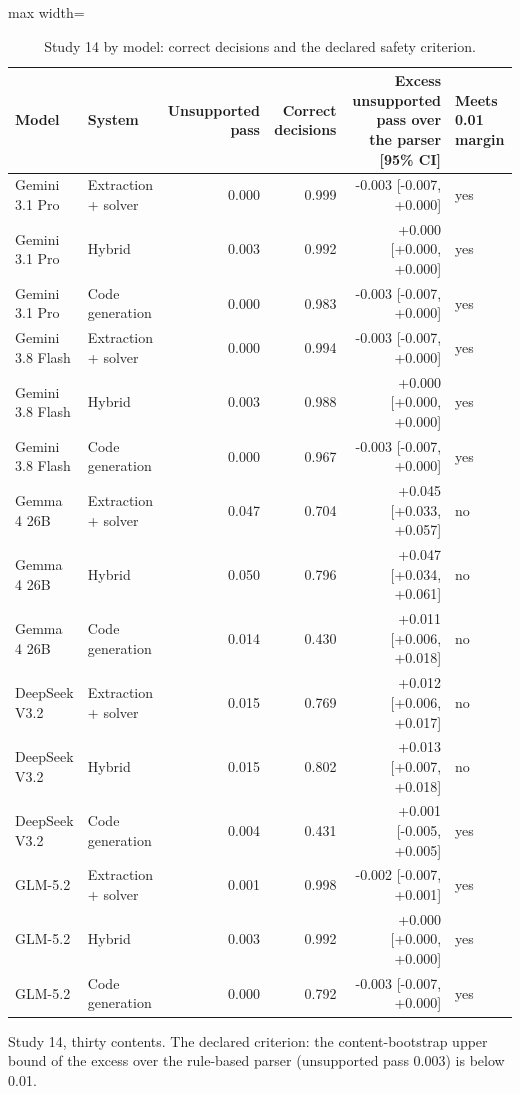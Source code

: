 \documentclass[10pt,twocolumn]{article}
\begin{document}
\begin{table}[t]
\centering\footnotesize\setlength{\tabcolsep}{4pt}
\caption{Study 14 by model: correct decisions and the declared safety criterion.}
\label{tab:29}
\begin{adjustbox}{max width=\textwidth}
\begin{tabular}{llrrrl}
\toprule
\textbf{Model} & \textbf{System} & \textbf{Unsupported pass} & \textbf{Correct decisions} & \textbf{Excess unsupported pass over the parser [95\% CI]} & \textbf{Meets 0.01 margin} \\
\midrule
Gemini 3.1 Pro & Extraction + solver & 0.000 & 0.999 & -0.003 [-0.007, +0.000] & yes \\
Gemini 3.1 Pro & Hybrid & 0.003 & 0.992 & +0.000 [+0.000, +0.000] & yes \\
Gemini 3.1 Pro & Code generation & 0.000 & 0.983 & -0.003 [-0.007, +0.000] & yes \\
Gemini 3.8 Flash & Extraction + solver & 0.000 & 0.994 & -0.003 [-0.007, +0.000] & yes \\
Gemini 3.8 Flash & Hybrid & 0.003 & 0.988 & +0.000 [+0.000, +0.000] & yes \\
Gemini 3.8 Flash & Code generation & 0.000 & 0.967 & -0.003 [-0.007, +0.000] & yes \\
Gemma 4 26B & Extraction + solver & 0.047 & 0.704 & +0.045 [+0.033, +0.057] & no \\
Gemma 4 26B & Hybrid & 0.050 & 0.796 & +0.047 [+0.034, +0.061] & no \\
Gemma 4 26B & Code generation & 0.014 & 0.430 & +0.011 [+0.006, +0.018] & no \\
DeepSeek V3.2 & Extraction + solver & 0.015 & 0.769 & +0.012 [+0.006, +0.017] & no \\
DeepSeek V3.2 & Hybrid & 0.015 & 0.802 & +0.013 [+0.007, +0.018] & no \\
DeepSeek V3.2 & Code generation & 0.004 & 0.431 & +0.001 [-0.005, +0.005] & yes \\
GLM-5.2 & Extraction + solver & 0.001 & 0.998 & -0.002 [-0.007, +0.001] & yes \\
GLM-5.2 & Hybrid & 0.003 & 0.992 & +0.000 [+0.000, +0.000] & yes \\
GLM-5.2 & Code generation & 0.000 & 0.792 & -0.003 [-0.007, +0.000] & yes \\
\bottomrule
\end{tabular}
\end{adjustbox}
\par\vspace{3pt}\begin{minipage}{\textwidth}\scriptsize Study 14, thirty contents. The declared criterion: the content-bootstrap upper bound of the excess over the rule-based parser (unsupported pass 0.003) is below 0.01.\end{minipage}
\end{table}
\end{document}
